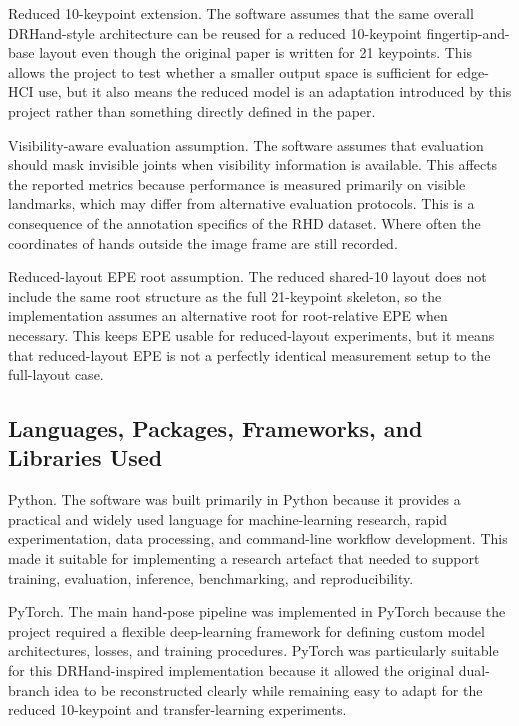 ﻿\documentclass[11pt,a4paper]{article}
\begin{document}
\medskip

Reduced 10-keypoint extension. The software assumes that the same overall DRHand-style architecture can be reused for a reduced 10-keypoint fingertip-and-base layout even though the original paper is written for 21 keypoints. This allows the project to test whether a smaller output space is sufficient for edge-HCI use, but it also means the reduced model is an adaptation introduced by this project rather than something directly defined in the paper.

\medskip

Visibility-aware evaluation assumption. The software assumes that evaluation should mask invisible joints when visibility information is available. This affects the reported metrics because performance is measured primarily on visible landmarks, which may differ from alternative evaluation protocols. This is a consequence of the annotation specifics of the RHD dataset. Where often the coordinates of hands outside the image frame are still recorded.

\medskip

Reduced-layout EPE root assumption. The reduced shared-10 layout does not include the same root structure as the full 21-keypoint skeleton, so the implementation assumes an alternative root for root-relative EPE when necessary. This keeps EPE usable for reduced-layout experiments, but it means that reduced-layout EPE is not a perfectly identical measurement setup to the full-layout case.

\subsection{Languages, Packages, Frameworks, and Libraries Used}

Python. The software was built primarily in Python because it provides a practical and widely used language for machine-learning research, rapid experimentation, data processing, and command-line workflow development. This made it suitable for implementing a research artefact that needed to support training, evaluation, inference, benchmarking, and reproducibility.

\medskip

PyTorch. The main hand-pose pipeline was implemented in PyTorch because the project required a flexible deep-learning framework for defining custom model architectures, losses, and training procedures. PyTorch was particularly suitable for this DRHand-inspired implementation because it allowed the original dual-branch idea to be reconstructed clearly while remaining easy to adapt for the reduced 10-keypoint and transfer-learning experiments.
\end{document}
